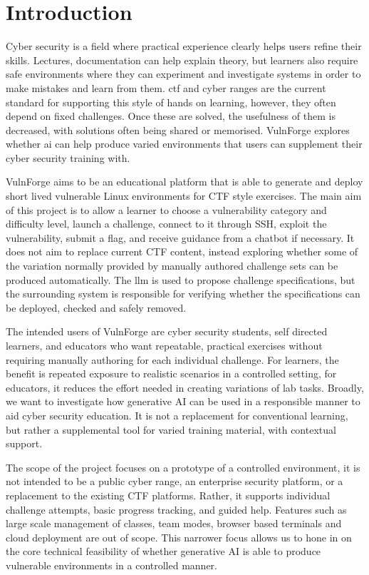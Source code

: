 \section{Introduction}\label{sec:introduction}

Cyber security is a field where practical experience clearly helps users refine their skills. Lectures, documentation can help explain theory, but learners also require safe environments where they can experiment and investigate systems in order to make mistakes and learn from them. \gls{ctf} and cyber ranges are the current standard for supporting this style of hands on learning, however, they often depend on fixed challenges. Once these are solved, the usefulness of them is decreased, with solutions often being shared or memorised. VulnForge explores whether \gls{ai} can help produce varied environments that users can supplement their cyber security training with.

VulnForge aims to be an educational platform that is able to generate and deploy short lived vulnerable Linux environments for CTF style exercises. The main aim of this project is to allow a learner to choose a vulnerability category and difficulty level, launch a challenge, connect to it through SSH, exploit the vulnerability, submit a flag, and receive guidance from a chatbot if necessary. It does not aim to replace current CTF content, instead exploring whether some of the variation normally provided by manually authored challenge sets can be produced automatically. The \gls{llm} is used to propose challenge specifications, but the surrounding system is responsible for verifying whether the specifications can be deployed, checked and safely removed.


The intended users of VulnForge are cyber security students, self directed learners, and educators who want repeatable, practical exercises without requiring manually authoring for each individual challenge. For learners, the benefit is repeated exposure to realistic scenarios in a controlled setting, for educators, it reduces the effort needed in creating variations of lab tasks. Broadly, we want to investigate how generative AI can be used in a responsible manner to aid cyber security education. It is not a replacement for conventional learning, but rather a supplemental tool for varied training material, with contextual support.

The scope of the project focuses on a prototype of a controlled environment, it is not intended to be a public cyber range, an enterprise security platform, or a replacement to the existing CTF platforms. Rather, it supports individual challenge attempts, basic progress tracking, and guided help. Features such as large scale management of classes, team modes, browser based terminals and cloud deployment are out of scope. This narrower focus allows us to hone in on the core technical feasibility of whether generative AI is able to produce vulnerable environments in a controlled manner.

